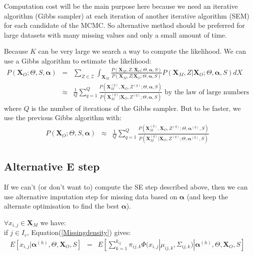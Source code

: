 \documentclass[12pt,a4paper]{report}
\begin{document}
	Computation cost will be the main purpose here because we need an iterative algorithm (Gibbs sampler) at each iteration of another iterative algorithm (SEM) for each candidate of the MCMC.
	So alternative method should be preferred for large datasets with many missing values and only a small amount of time.
	
	Because $K$ can be very large we search a way to compute the likelihood.
	We can use a Gibbs algorithm to estimate the likelihood:
	\begin{eqnarray}
	P(\boldsymbol{X}_O;\Theta, S, \boldsymbol{\alpha})&=& 
		\sum_{Z\in \mathcal{Z}}\int_{\boldsymbol{X}_M}\frac{P(\boldsymbol{X}_M,Z,\boldsymbol{X}_O;\Theta,\boldsymbol{\alpha},S)}{P(\boldsymbol{X}_M,Z|\boldsymbol{X}_O;\Theta,\boldsymbol{\alpha},S)}P(\boldsymbol{X}_M,Z|\boldsymbol{X}_O;\Theta,\boldsymbol{\alpha},S) dX \\
		&\approx &\frac{1}{Q} \sum_{q=1}^Q\frac{P(\boldsymbol{X}_M^{(q)},\boldsymbol{X}_O,Z^{(q)};\Theta,\boldsymbol{\alpha},S)}{P(\boldsymbol{X}_M^{(q)}|\boldsymbol{X}_O,Z^{(q)};\Theta,\boldsymbol{\alpha},S)} \textrm{ by the law of large numbers}
	\end{eqnarray}		
	where $Q$ is the number of iterations of the Gibbs sampler.
	But to be faster, we use the previous Gibbs algorithm with:
	\begin{eqnarray}
	P(\boldsymbol{X}_O;\Theta, S, \boldsymbol{\alpha})&\approx & \frac{1}{Q} \sum_{q=1}^Q\frac{P(\boldsymbol{X}_M^{(q)},\boldsymbol{X}_O,Z^{(q)};\Theta,\boldsymbol{\alpha}^{(q)},S)}{P(\boldsymbol{X}_M^{(q)}|\boldsymbol{X}_O,Z^{(q)};\Theta,\boldsymbol{\alpha}^{(q)},S)}
	\end{eqnarray}	
		
\subsection{Alternative E step}
	If we can't (or don't want to) compute the SE step described above, then we can use alternative imputation step for missing data based on $\boldsymbol{\alpha}$ (and keep the alternate optimisation to find the best $\boldsymbol{\alpha}$). 
	
	$\forall x_{i,j} \in \boldsymbol{X}_M $ we have:
	\\
if $j\in I_r$, Equation(\ref{Missingdensity}) gives: 
	\begin{eqnarray}
	E[x_{i,j}|\boldsymbol{\alpha}^{(h)},\Theta,\boldsymbol{X}_O,S]&=&E[\sum_{k=1}^{k_{ij}}\pi_{ij,k}\Phi(x_{i,j}|\mu_{ij,k},\Sigma_{ij,k})|\boldsymbol{\alpha}^{(h)},\Theta,\boldsymbol{X}_O,S] 
	\end{eqnarray}
	  
\end{document}
